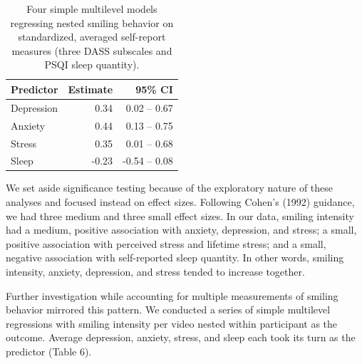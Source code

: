 \documentclass[authordate, empirical]{jote-new-article}
\begin{document}
\begin{table}[b!]
  \begin{fullwidth}
    \caption{Four simple multilevel models regressing nested smiling behavior on standardized, averaged self-report measures (three DASS subscales and PSQI sleep quantity).}
    \begin{tabularx}{\linewidth}{@{} X r r  @{}}
      \toprule
      \textbf{Predictor} & \textbf{Estimate} & \textbf{95\% CI} \\
      \bottomrule

      Depression         & 0.34              & 0.02 – 0.67      \\

      Anxiety            & 0.44              & 0.13 – 0.75      \\

      Stress             & 0.35              & 0.01 – 0.68      \\


      Sleep              & -0.23             & -0.54 – 0.08     \\
      \bottomrule
    \end{tabularx}
  \end{fullwidth}
\end{table}



We set aside significance testing because of the exploratory nature of these analyses and focused instead on effect sizes. Following Cohen's (1992) guidance, we had three medium and three small effect sizes. In our data, smiling intensity had a medium, positive association with anxiety, depression, and stress; a small, positive association with perceived stress and lifetime stress; and a small, negative association with self-reported sleep quantity. In other words, smiling intensity, anxiety, depression, and stress tended to increase together.



Further investigation while accounting for multiple measurements of smiling behavior mirrored this pattern. We conducted a series of simple multilevel regressions with smiling intensity per video nested within participant as the outcome. Average depression, anxiety, stress, and sleep each took its turn as the predictor (Table 6).
\end{document}
